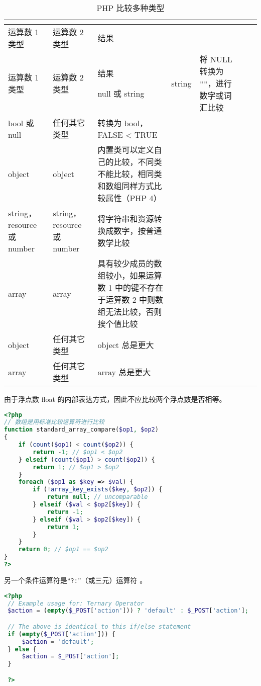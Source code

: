 \begin{longtable}{|m{90pt}|m{90pt}|m{200pt}|}
\tabularnewline\hline
运算数 1 类型	&运算数 2 类型	&结果
\endhead

\caption{PHP 比较多种类型}\\
\hline
运算数 1 类型	&运算数 2 类型	&结果
\endfirsthead

\endfoot

\endlastfoot
\hline
null 或 string	&string	&将 NULL 转换为 \texttt{""}，进行数字或词汇比较\\
\hline
bool 或 null	&任何其它类型	&转换为 bool，FALSE < TRUE\\
\hline
object	&object	 &内置类可以定义自己的比较，不同类不能比较，相同类和数组同样方式比较属性（PHP 4）\\
\hline
string，resource 或 number	&string，resource 或 number	&将字符串和资源转换成数字，按普通数学比较\\
\hline
array	&array	 &具有较少成员的数组较小，如果运算数 1 中的键不存在于运算数 2 中则数组无法比较，否则挨个值比较\\
\hline
object	&任何其它类型	&object 总是更大\\
\hline
array	&任何其它类型	&array 总是更大\\
\hline
\end{longtable}




由于浮点数 float 的内部表达方式，因此不应比较两个浮点数是否相等。


\begin{lstlisting}[language=PHP]
<?php
// 数组是用标准比较运算符进行比较
function standard_array_compare($op1, $op2)
{
    if (count($op1) < count($op2)) {
        return -1; // $op1 < $op2
    } elseif (count($op1) > count($op2)) {
        return 1; // $op1 > $op2
    }
    foreach ($op1 as $key => $val) {
        if (!array_key_exists($key, $op2)) {
            return null; // uncomparable
        } elseif ($val < $op2[$key]) {
            return -1;
        } elseif ($val > $op2[$key]) {
            return 1;
        }
    }
    return 0; // $op1 == $op2
}
?>
\end{lstlisting}

另一个条件运算符是“\texttt{?:}”（或三元）运算符 。


\begin{lstlisting}[language=PHP]
<?php
 // Example usage for: Ternary Operator
 $action = (empty($_POST['action'])) ? 'default' : $_POST['action'];

 // The above is identical to this if/else statement
 if (empty($_POST['action'])) {
     $action = 'default';
 } else {
     $action = $_POST['action'];
 }

 ?>
\end{lstlisting}

